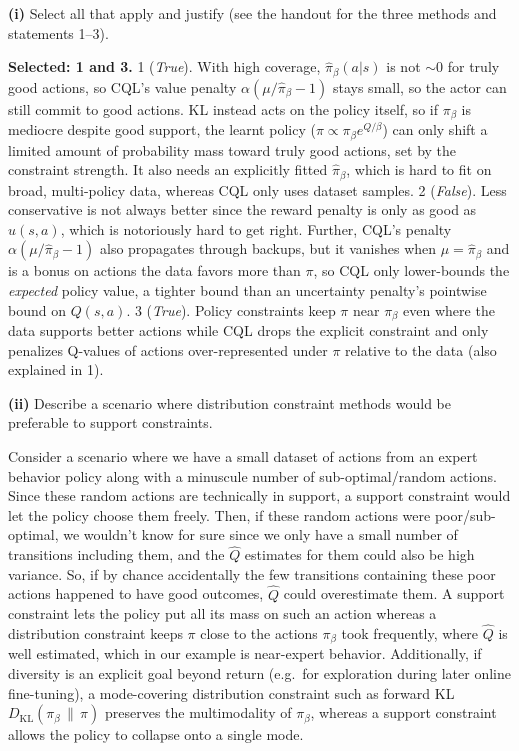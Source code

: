 \documentclass[11pt]{article}
\begin{document}
\newpage
{}

\textbf{(i)} Select all that apply and justify (see the handout for the three methods and statements 1--3).
\begin{answer}[height=6cm]
  \small\setlength{\parskip}{2pt}
  \textbf{Selected: 1 and 3.}
  1 (\emph{True}). With high coverage, $\hat\pi_\beta(a|s)$ is not $\sim0$ for truly good actions, so CQL's value penalty $\alpha(\mu/\hat\pi_\beta-1)$ stays small, so the actor can still commit to good actions. KL instead acts on the policy itself, so if $\pi_\beta$ is mediocre despite good support, the learnt policy ($\pi\propto\pi_\beta e^{Q/\beta}$) can only shift a limited amount of probability mass toward truly good actions, set by the constraint strength. It also needs an explicitly fitted $\hat\pi_\beta$, which is hard to fit on broad, multi-policy data, whereas CQL only uses dataset samples.
  2 (\emph{False}). Less conservative is not always better since the reward penalty is only as good as $u(s,a)$, which is notoriously hard to get right. Further, CQL's penalty $\alpha(\mu/\hat\pi_\beta-1)$ also propagates through backups, but it vanishes when $\mu=\hat\pi_\beta$ and is a bonus on actions the data favors more than $\pi$, so CQL only lower-bounds the \emph{expected} policy value, a tighter bound than an uncertainty penalty's pointwise bound on $Q(s,a)$.
  3 (\emph{True}). Policy constraints keep $\pi$ near $\pi_\beta$ even where the data supports better actions while CQL drops the explicit constraint and only penalizes Q-values of actions over-represented under $\pi$ relative to the data (also explained in 1).
\end{answer}

\textbf{(ii)} Describe a scenario where distribution constraint methods would be preferable to support constraints.
\begin{answer}[height=6cm]
  \small
  Consider a scenario where we have a small dataset of actions from an expert behavior policy along with a minuscule number of sub-optimal/random actions. Since these random actions are technically in support, a support constraint would let the policy choose them freely. Then, if these random actions were poor/sub-optimal, we wouldn't know for sure since we only have a small number of transitions including them, and the $\hat Q$ estimates for them could also be high variance. So, if by chance accidentally the few transitions containing these poor actions happened to have good outcomes, $\hat Q$ could overestimate them. A support constraint lets the policy put all its mass on such an action whereas a distribution constraint keeps $\pi$ close to the actions $\pi_\beta$ took frequently, where $\hat Q$ is well estimated, which in our example is near-expert behavior. Additionally, if diversity is an explicit goal beyond return (e.g.\ for exploration during later online fine-tuning), a mode-covering distribution constraint such as forward KL $D_\mathrm{KL}(\pi_\beta\,\|\,\pi)$ preserves the multimodality of $\pi_\beta$, whereas a support constraint allows the policy to collapse onto a single mode.
\end{answer}
\end{document}
